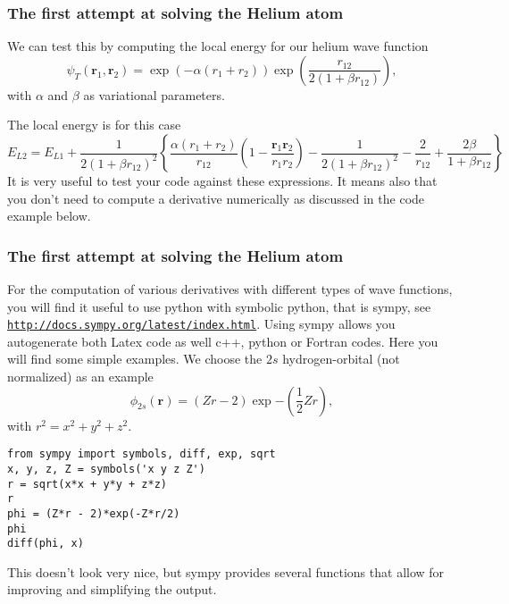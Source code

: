 \documentclass{beamer}
\begin{document}
\begin{frame}
\frametitle{The first attempt at solving the Helium atom}

\begin{block}{}

We can test this by computing the local energy for our helium wave function
\[
   \psi_{T}(\bm{r}_1,\bm{r}_2) = 
   \exp{\left(-\alpha(r_1+r_2)\right)}
   \exp{\left(\frac{r_{12}}{2(1+\beta r_{12})}\right)}, 
\]
with $\alpha$ and $\beta$ as variational parameters.

The local energy is for this case 
\[ 
E_{L2} = E_{L1}+\frac{1}{2(1+\beta r_{12})^2}\left\{\frac{\alpha(r_1+r_2)}{r_{12}}(1-\frac{\bm{r}_1\bm{r}_2}{r_1r_2})-\frac{1}{2(1+\beta r_{12})^2}-\frac{2}{r_{12}}+\frac{2\beta}{1+\beta r_{12}}\right\}
\]
It is very useful to test your code against these expressions. It means also that you don't need to
compute a derivative numerically as discussed in the code example below. 
\end{block}
\end{frame}

\begin{frame}
\frametitle{The first attempt at solving the Helium atom}

\begin{block}{}
For the computation of various derivatives with different types of wave functions, you will find it useful to use python with symbolic python, that is sympy, see \href{{http://docs.sympy.org/latest/index.html}}{\nolinkurl{http://docs.sympy.org/latest/index.html}}.  Using sympy allows you autogenerate both Latex code as well c++, python or Fortran codes. Here you will find some simple examples. We choose 
the $2s$ hydrogen-orbital  (not normalized) as an example
\[
 \phi_{2s}(\bm{r}) = (Zr - 2)\exp{-(\frac{1}{2}Zr)},
\]
with $ r^2 = x^2 + y^2 + z^2$.

\begin{verbatim}
from sympy import symbols, diff, exp, sqrt
x, y, z, Z = symbols('x y z Z')
r = sqrt(x*x + y*y + z*z)
r
phi = (Z*r - 2)*exp(-Z*r/2)
phi
diff(phi, x)
\end{verbatim}
This doesn't look very nice, but sympy provides several functions that allow for improving and simplifying the output.
\end{block}
\end{frame}
\end{document}
